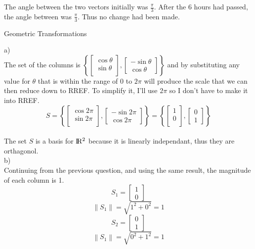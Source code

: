 \documentclass[12pt]{article}
\newcommand{\dbarl}{\left\lVert}
\newcommand{\dbarr}{\right\rVert}
\newcommand{\sqbrl}{\left[}
\newcommand{\sqbrr}{\right]}
\newenvironment{problem}[2][Problem]{\begin{trivlist}
\item[\hskip \labelsep {\bfseries #1}\hskip \labelsep {\bfseries #2.}]}{\end{trivlist}}
\begin{document}
The angle between the two vectors initially was $\frac{\pi}{3}$. After the 6 hours had passed, the angle between was $\frac{\pi}{3}$. Thus no change had been made.

\begin{problem}{7}
	Geometric Transformations
\end{problem}

a)\\ 
The set of the columns is $\left\{\sqbrl\begin{matrix}\cos{\theta}\\ \sin{\theta}\\\end{matrix}\sqbrr,\sqbrl\begin{matrix}-\sin{\theta}\\\cos{\theta}\end{matrix}\sqbrr\right\}$ and by substituting any value for $\theta$ that is within the range of 0 to $2\pi$ will produce the scale that we can then reduce down to RREF. To simplify it, I'll use $2\pi$ so I don't have to make it into RREF.\\
	\[S= \left\{\sqbrl\begin{matrix}
	\cos{2\pi}\\
	\sin{2\pi}\\\end{matrix}\sqbrr,
	\sqbrl\begin{matrix}
	-\sin{2\pi}\\
	\cos{2\pi}\end{matrix}\sqbrr
	\right\}
	=
	\left\{\sqbrl\begin{matrix}
	1\\
	0\\\end{matrix}\sqbrr,
	\sqbrl\begin{matrix}
	0\\
	1\end{matrix}\sqbrr
	\right\}
	\]\\
The set $S$ is a basis for $ \rm I\!R^2 $ because it is linearly independant, thus they are orthagonol.\\

b)\\
Continuing from the previous question, and using the same result, the magnitude of each column is 1. \\
	\[S_1 = \sqbrl\begin{matrix}1\\0\end{matrix}\sqbrr\]
	\[\dbarl S_1\dbarr = \sqrt{1^2 + 0^2} = 1\]
	\[S_2 = \sqbrl\begin{matrix}0\\1\end{matrix}\sqbrr\]
	\[\dbarl S_1\dbarr = \sqrt{0^2 + 1^2} = 1\]
	
\end{document}
